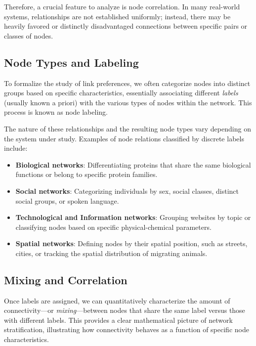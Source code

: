 Therefore, a crucial feature to analyze is node correlation. In many real-world systems, relationships are not established uniformly; instead, there may be heavily favored or distinctly disadvantaged connections between specific pairs or classes of nodes.

\subsection{Node Types and Labeling}
\label{subsec:node_types_labeling}

To formalize the study of link preferences, we often categorize nodes into distinct groups based on specific characteristics, essentially associating different \textit{labels} (usually known a priori) with the various types of nodes within the network. This process is known as node labeling.

The nature of these relationships and the resulting node types vary depending on the system under study. Examples of node relations classified by discrete labels include:
\begin{itemize}
    \item \textbf{Biological networks}: Differentiating proteins that share the same biological functions or belong to specific protein families.
    \item \textbf{Social networks}: Categorizing individuals by sex, social classes, distinct social groups, or spoken language.
    \item \textbf{Technological and Information networks}: Grouping websites by topic or classifying nodes based on specific physical-chemical parameters.
    \item \textbf{Spatial networks}: Defining nodes by their spatial position, such as streets, cities, or tracking the spatial distribution of migrating animals.
\end{itemize}

\subsection{Mixing and Correlation}
\label{subsec:mixing_correlation}

Once labels are assigned, we can quantitatively characterize the amount of connectivity—or \textit{mixing}—between nodes that share the same label versus those with different labels. This provides a clear mathematical picture of network stratification, illustrating how connectivity behaves as a function of specific node characteristics.

